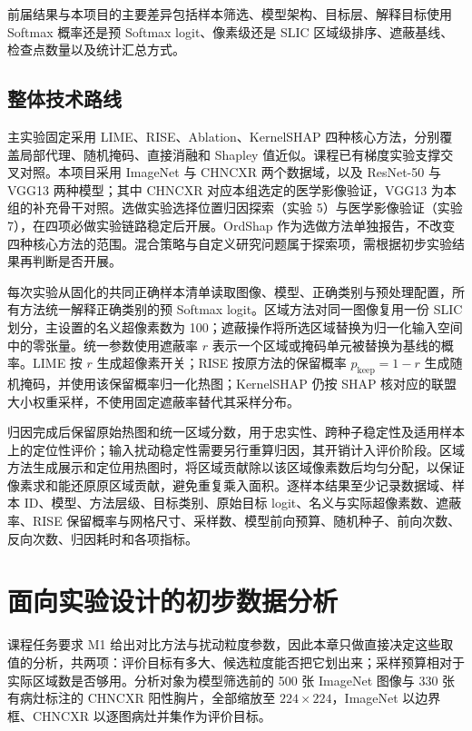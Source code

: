 前届结果与本项目的主要差异包括样本筛选、模型架构、目标层、解释目标使用 Softmax 概率还是预 Softmax logit、像素级还是 SLIC 区域级排序、遮蔽基线、检查点数量以及统计汇总方式。

\section{整体技术路线}

主实验固定采用 LIME、RISE、Ablation、KernelSHAP 四种核心方法，分别覆盖局部代理、随机掩码、直接消融和 Shapley 值近似。课程已有梯度实验支撑交叉对照。本项目采用 ImageNet 与 CHNCXR 两个数据域，以及 ResNet-50 与 VGG13 两种模型；其中 CHNCXR 对应本组选定的医学影像验证，VGG13 为本组的补充骨干对照。选做实验选择位置归因探索（实验 5）与医学影像验证（实验 7），在四项必做实验链路稳定后开展。OrdShap 作为选做方法单独报告，不改变四种核心方法的范围。混合策略与自定义研究问题属于探索项，需根据初步实验结果再判断是否开展。

每次实验从固化的共同正确样本清单读取图像、模型、正确类别与预处理配置，所有方法统一解释正确类别的预 Softmax logit。区域方法对同一图像复用一份 SLIC 划分，主设置的名义超像素数为 100；遮蔽操作将所选区域替换为归一化输入空间中的零张量。统一参数使用遮蔽率 $r$ 表示一个区域或掩码单元被替换为基线的概率。LIME 按 $r$ 生成超像素开关；RISE 按原方法的保留概率 $p_{\mathrm{keep}}=1-r$ 生成随机掩码，并使用该保留概率归一化热图；KernelSHAP 仍按 SHAP 核对应的联盟大小权重采样，不使用固定遮蔽率替代其采样分布。

归因完成后保留原始热图和统一区域分数，用于忠实性、跨种子稳定性及适用样本上的定位性评价；输入扰动稳定性需要另行重算归因，其开销计入评价阶段。区域方法生成展示和定位用热图时，将区域贡献除以该区域像素数后均匀分配，以保证像素求和能还原原区域贡献，避免重复乘入面积。逐样本结果至少记录数据域、样本 ID、模型、方法层级、目标类别、原始目标 logit、名义与实际超像素数、遮蔽率、RISE 保留概率与网格尺寸、采样数、模型前向预算、随机种子、前向次数、反向次数、归因耗时和各项指标。

\chapter{面向实验设计的初步数据分析}

课程任务要求 M1 给出对比方法与扰动粒度参数，因此本章只做直接决定这些取值的分析，共两项：评价目标有多大、候选粒度能否把它划出来；采样预算相对于实际区域数是否够用。分析对象为模型筛选前的 500 张 ImageNet 图像与 330 张有病灶标注的 CHNCXR 阳性胸片，全部缩放至 $224\times224$，ImageNet 以边界框、CHNCXR 以逐图病灶并集作为评价目标。

